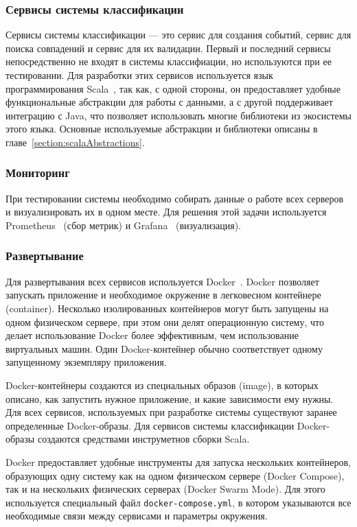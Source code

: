 \documentclass[14pt]{article}
\begin{document}
\subsubsection{Сервисы системы классификации}
Сервисы системы классификации --- это сервис для создания событий, сервис для поиска совпадений и сервис для их валидации. Первый и последний сервисы непосредственно не входят в системы классифиации, но используются при ее тестировании. Для разработки этих сервисов используется язык программирования Scala~\cite{scala}, так как, с одной стороны, он предоставляет удобные функциональные абстракции для работы с данными, а с другой поддерживает интеграцию с Java, что позволяет использовать многие библиотеки из экосистемы этого языка. Основные используемые абстракции и библиотеки описаны в главе~\ref{section:scalaAbstractions}.

\subsubsection{Мониторинг}
При тестировании системы необходимо собирать данные о работе всех серверов и визуализировать их в одном месте. Для решения этой задачи используется Prometheus~\cite{prometheus} (сбор метрик) и Grafana~\cite{grafana} (визуализация).

\subsubsection{Развертывание}
Для развертывания всех сервисов используется Docker~\cite{docker}. Docker позволяет запускать приложение и необходимое окружение в легковесном контейнере (container). Несколько изолированных контейнеров могут быть запущены на одном физическом сервере, при этом они делят операционную систему, что делает использование Docker более эффективным, чем использование виртуальных машин. Один Docker-контейнер обычно соответствует одному запущенному экземпляру приложения.

Docker-контейнеры создаются из специальных образов (image), в которых описано, как запустить нужное приложение, и какие зависимости ему нужны. Для всех сервисов, используемых при разработке системы существуют заранее определенные Docker-образы. Для сервисов системы классификации Docker-образы создаются средствами инструметнов сборки Scala.

Docker предоставляет удобные инструменты для запуска нескольких контейнеров, образующих одну систему как на одном физическом сервере (Docker Compose), так и на нескольких физических серверах (Docker Swarm Mode). Для этого используется специальный файл \verb|docker-compose.yml|, в котором указываются все необходимые связи между сервисами и параметры окружения.
\end{document}
